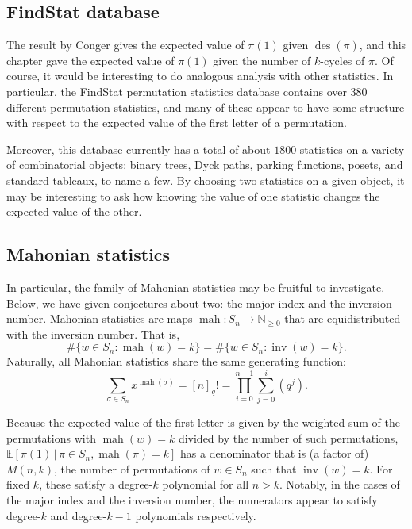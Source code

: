 \subsection{FindStat database}
The result by Conger gives the expected value of $\pi(1)$ given
$\operatorname{des}(\pi)$, and this chapter gave the expected value of
$\pi(1)$ given the number of $k$-cycles of $\pi$. Of course, it would be
interesting to do analogous analysis with other statistics.
In particular,
the FindStat permutation statistics database \cite{FindStat} contains over
380 different permutation statistics, and many of these appear to have some
structure with respect to the expected value of the first letter of a
permutation.

Moreover, this database currently has a total of about $1800$ statistics on a
variety of combinatorial objects: binary trees, Dyck paths, parking functions,
posets, and standard tableaux, to name a few.
By choosing two statistics on a given object, it may be interesting to ask how
knowing the value of one statistic changes the expected value of the other.

\subsection{Mahonian statistics}
In particular, the family of Mahonian statistics may be fruitful to investigate.
Below, we have given conjectures about two: the major index and the inversion number.
Mahonian statistics are maps
$\operatorname{mah} \colon S_n \rightarrow \mathbb{N}_{\geq0}$ that are
equidistributed with the inversion number.\cite{Foata} That is, \begin{equation}
  \#\{w \in S_n : \operatorname{mah}(w) = k\} =
  \#\{w \in S_n : \operatorname{inv}(w) = k\}.
\end{equation}
Naturally, all Mahonian statistics share the same generating function: \begin{equation}
  \sum_{\sigma \in S_n} x^{\operatorname{mah}(\sigma)}
    = [n]_q!
    = \prod_{i=0}^{n-1}\sum_{j=0}^i(q^j).
\end{equation}

Because the expected value of the first letter is given by the weighted sum of
the permutations with $\operatorname{mah}(w) = k$ divided by the number of such
permutations, $\mathbb{E}[\pi(1)\, |\, \pi \in S_n, \operatorname{mah}(\pi) = k]$
has a denominator that is (a factor of) $M(n,k)$, the number of permutations
of $w \in S_n$ such that $\operatorname{inv}(w) = k$. For fixed $k$, these
satisfy a degree-$k$ polynomial for all $n > k$. Notably, in the cases of
the major index and the inversion number, the numerators appear to satisfy
degree-$k$ and {degree-$k-1$} polynomials respectively.

